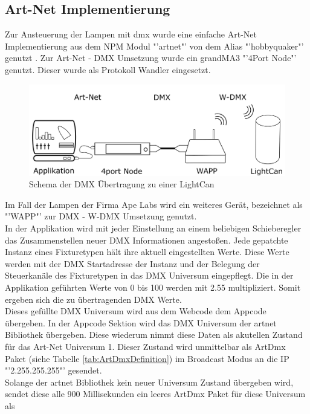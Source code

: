\documentclass[11pt]{scrartcl}
\begin{document}
\subsection{Art-Net Implementierung}
Zur Ansteuerung der Lampen mit \ac{dmx} wurde eine einfache Art-Net Implementierung aus dem NPM Modul "'artnet"' von dem Alias "'hobbyquaker"' genutzt
\cite{artnetPackage}. Zur Art-Net - DMX Umsetzung wurde ein grandMA3 "'4Port Node"' genutzt. Dieser wurde als Protokoll Wandler eingesetzt.\\
\begin{figure}[H]
    \begin{center}
        \includegraphics[width=.9\textwidth]{images/Data_transmission_scheme.png}
    \end{center}
    \caption{Schema der DMX Übertragung zu einer LightCan}\label{fig:dataScheme}
\end{figure}
\noindent
Im Fall der Lampen der Firma Ape Labs wird ein weiteres Gerät, bezeichnet als "'WAPP"' zur DMX - W-DMX Umsetzung genutzt.\\
In der Applikation wird mit jeder Einstellung an einem beliebigen Schieberegler das Zusammenstellen neuer DMX Informationen angestoßen. Jede gepatchte
Instanz eines Fixturetypen hält ihre aktuell eingestellten Werte. Diese Werte werden mit der DMX Startadresse der Instanz und der Belegung der Steuerkanäle
des Fixturetypen in das DMX Universum eingepflegt. Die in der Applikation geführten Werte von 0 bis 100 werden mit 2.55 multipliziert. Somit ergeben sich die
zu übertragenden DMX Werte.\\
Dieses gefüllte DMX Universum wird aus dem Webcode dem Appcode übergeben. In der Appcode Sektion wird das DMX Universum der artnet Bibliothek übergeben. Diese
wiederum nimmt diese Daten als akutellen Zustand für das Art-Net Universum 1. Dieser Zustand wird unmittelbar als ArtDmx Paket (siehe Tabelle \ref{tab:ArtDmxDefinition})
im Broadcast Modus an die IP "'2.255.255.255"' gesendet.\\
Solange der artnet Bibliothek kein neuer Universum Zustand übergeben wird, sendet diese alle 900 Millisekunden ein leeres ArtDmx Paket für diese Universum als
\end{document}
